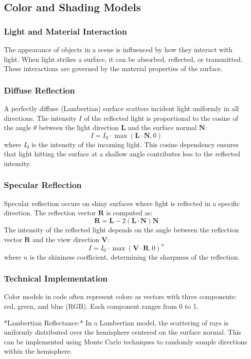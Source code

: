 \documentclass[12pt]{article}
\begin{document}
\subsection{Color and Shading Models}
\subsubsection{Light and Material Interaction}
The appearance of objects in a scene is influenced by how they interact with light. When light strikes a surface, it can be absorbed, reflected, or transmitted. These interactions are governed by the material properties of the surface.

\subsubsection{Diffuse Reflection}
A perfectly diffuse (Lambertian) surface scatters incident light uniformly in all directions. The intensity \(I\) of the reflected light is proportional to the cosine of the angle \(\theta\) between the light direction \(\mathbf{L}\) and the surface normal \(\mathbf{N}\):
\[
    I = I_0 \cdot \max(\mathbf{L} \cdot \mathbf{N}, 0)
\]
where \(I_0\) is the intensity of the incoming light. This cosine dependency ensures that light hitting the surface at a shallow angle contributes less to the reflected intensity.

\subsubsection{Specular Reflection}
Specular reflection occurs on shiny surfaces where light is reflected in a specific direction. The reflection vector \(\mathbf{R}\) is computed as:
\[
    \mathbf{R} = \mathbf{L} - 2(\mathbf{L} \cdot \mathbf{N})\mathbf{N}
\]
The intensity of the reflected light depends on the angle between the reflection vector \(\mathbf{R}\) and the view direction \(\mathbf{V}\):
\[
    I = I_0 \cdot \max(\mathbf{V} \cdot \mathbf{R}, 0)^n
\]
where \(n\) is the shininess coefficient, determining the sharpness of the reflection.

\subsubsection{Technical Implementation}
Color models in code often represent colors as vectors with three components: red, green, and blue (RGB). Each component ranges from 0 to 1.

*Lambertian Reflectance:* In a Lambertian model, the scattering of rays is uniformly distributed over the hemisphere centered on the surface normal. This can be implemented using Monte Carlo techniques to randomly sample directions within the hemisphere.
\end{document}
